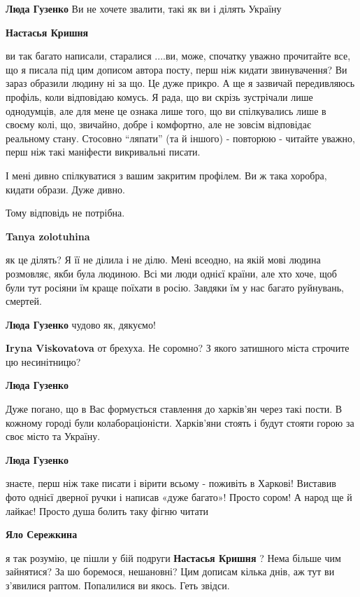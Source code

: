 \begin{itemize}
\begin{itemize}
\textbf{Люда Гузенко} Ви не хочете звалити, такі як ви і ділять Україну

\textbf{Настасья Кришня}

ви так багато написали, старалися ....ви, може, спочатку уважно прочитайте все,
що я писала під цим дописом автора посту, перш ніж кидати звинувачення? Ви
зараз образили людину ні за що. Це дуже прикро. А ще я зазвичай передивляюсь
профіль, коли відповідаю комусь. Я рада, що ви скрізь зустрічали лише
однодумців, але для мене це ознака лише того, що ви спілкувались лише в своєму
колі, що, звичайно, добре і комфортно, але не зовсім відповідає реальному
стану. Стосовно \enquote{ляпати} (та й іншого) - повторюю - читайте уважно,
перш ніж такі маніфести викривальні писати.

І мені дивно спілкуватися з вашим закритим профілем. Ви ж така хоробра, кидати
образи. Дуже дивно.

Тому відповідь не потрібна.

\textbf{Tanya zolotuhina} 

як це ділять? Я її не ділила і не ділю. Мені всеодно, на якій мові людина
розмовляє, якби була людиною. Всі ми люди однієї країни, але хто хоче, щоб були
тут росіяни їм краще поїхати в росію. Завдяки їм у нас багато руйнувань,
смертей.

\textbf{Люда Гузенко} чудово як, дякуємо!

\textbf{Iryna Viskovatova} от брехуха. Не соромно? З якого затишного міста строчите цю несинітницю?

\textbf{Люда Гузенко} 

Дуже погано, що в Вас формується ставлення до харків'ян через такі пости. В
кожному городі були колабораціоністи. Харків'яни стоять і будут стояти горою за
своє місто та Україну.

\textbf{Люда Гузенко} 

знаєте, перш ніж таке писати і вірити всьому - поживіть в Харкові! Виставив
фото однієї дверної ручки і написав «дуже багато»! Просто сором! А народ ще й
лайкає! Просто душа болить таку фігню читати

\textbf{Яло Сережкина}

я так розумію, це пішли у бій подруги \textbf{Настасья Кришня} ? Нема більше чим
зайнятися? За шо боремося, нешановні? Цим дописам кілька днів, аж тут ви
з'явилися раптом. Попалилися ви якось. Геть звідси.


\end{itemize}
\end{itemize}
